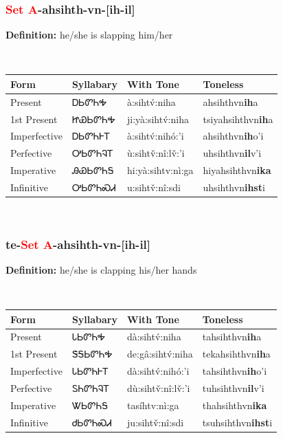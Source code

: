 \subsubsection*{\textcolor{Red}{Set A}{-}\textbf{ahsihth}{-}vn{-}[ih-il]}
\nopagebreak
\textbf{Definition: } he/she is slapping him/her
\\[0.5em]
\begin{tabularx}{\textwidth}{l X X X}%
\toprule%
\textbf{Form}&\textbf{Syllabary}&\textbf{With Tone}&\textbf{Toneless}\\%
\midrule%
Present&ᎠᏏᏛᏂᎭ&à:sihtv́:niha&ahsihthvn\textbf{ih}a\\%
1st Present&ᏥᏯᏏᏛᏂᎭ&ji:yà:sihtv́:niha&tsiyahsihthvn\textbf{ih}a\\%
Imperfective&ᎠᏏᏛᏂᎰᎢ&à:sihtv́:nihó:’i&ahsihthvn\textbf{ih}o'i\\%
Perfective&ᎤᏏᏛᏂᎸᎢ&ù:sihtv̌:nî:lv̌:’i&uhsihthvn\textbf{il}v'i\\%
Imperative&ᎯᏯᏏᏛᏂᎦ&hi:yà:sihtv:nì:ga&hiyahsihthvn\textbf{ika}\\%
Infinitive&ᎤᏏᏛᏂᏍᏗ&u:sihtv̌:nî:sdi&uhsihthvn\textbf{ihst}i\\%
\bottomrule%
\end{tabularx}
\\[1em]
\needspace{2in}
\subsubsection*{te{-}\textcolor{Red}{Set A}{-}\textbf{ahsihth}{-}vn{-}[ih-il]}
\nopagebreak
\textbf{Definition: } he/she is clapping his/her hands
\\[0.5em]
\begin{tabularx}{\textwidth}{l X X X}%
\toprule%
\textbf{Form}&\textbf{Syllabary}&\textbf{With Tone}&\textbf{Toneless}\\%
\midrule%
Present&ᏓᏏᏛᏂᎭ&dà:sihtv́:niha&tahsihthvn\textbf{ih}a\\%
1st Present&ᏕᎦᏏᏛᏂᎭ&de:gâ:sihtv́:niha&tekahsihthvn\textbf{ih}a\\%
Imperfective&ᏓᏏᏛᏂᎰᎢ&dà:sihtv́:nihó:’i&tahsihthvn\textbf{ih}o'i\\%
Perfective&ᏚᏂᏛᏂᎸᎢ&dù:sihtv̌:nî:lv̌:’i&tuhsihthvn\textbf{il}v'i\\%
Imperative&ᏔᏏᏛᏂᎦ&tasíhtv:nì:ga&thahsihthvn\textbf{ika}\\%
Infinitive&ᏧᏏᏛᏂᏍᏗ&ju:sihtv̌:nî:sdi&tsuhsihthvn\textbf{ihst}i\\%
\bottomrule%
\end{tabularx}
\\[1em]